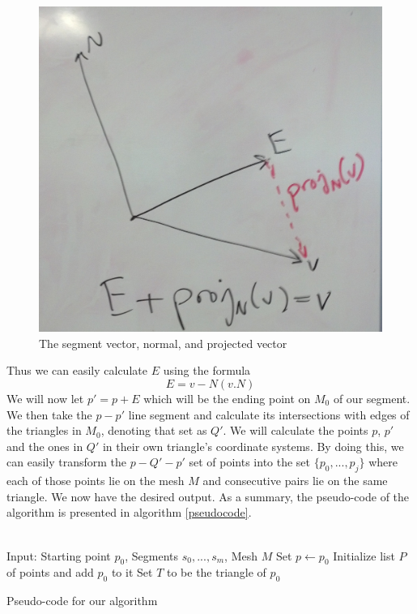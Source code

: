 \begin{figure}[ht]
\centering
\includegraphics[width=\columnwidth]{vectordiagram.jpg}
\caption{The segment vector, normal, and projected vector}
\label{vectordiagram}
\end{figure}

Thus we can easily calculate $E$ using the formula
\[
E = v - N(v.N)
\]
We will now let $p' = p+E$ which will be the ending point on $M_0$ of our segment. We then take the $p-p'$ line segment and calculate its intersections with edges of the triangles in $M_0$, denoting that set as $Q'$. We will calculate the points $p$, $p'$ and the ones in $Q'$ in their own triangle's coordinate systems. By doing this, we can easily transform the $p-Q'-p'$ set of points into the set $\{p_0,...,p_j\}$ where each of those points lie on the mesh $M$ and consecutive pairs lie on the same triangle. We now have the desired output. As a summary, the pseudo-code of the algorithm is presented in algorithm \ref{pseudocode}. \\
\\
\begin{algorithm}[t]
Input: Starting point $p_0$, Segments $s_0,...,s_m$, Mesh $M$\;
Set $p \leftarrow p_0$ \;
Initialize list $P$ of points and add $p_0$ to it \;
Set $T$ to be the triangle of $p_0$ \;
\caption{Pseudo-code for our algorithm}
\label{pseudocode}
\end{algorithm}

